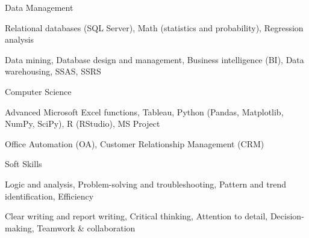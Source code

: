 \documentclass[11pt, a4paper]{awesome-cv}
\begin{document}
\begin{cvskills}

  \cvskill
    {Data Management} %
    {
      \begin{cvitems}
        \item {Relational databases (SQL Server), Math (statistics and probability), Regression analysis}
        \item {Data mining, Database design and management, Business intelligence (BI), Data warehousing, SSAS, SSRS}
      \end{cvitems}
    }

  \cvskill
    {Computer Science} %
    {
      \begin{cvitems} %
        \item {Advanced Microsoft Excel functions, Tableau, Python (Pandas, Matplotlib, NumPy, SciPy), R (RStudio), MS Project}
        \item {Office Automation (OA), Customer Relationship Management (CRM)}
      \end{cvitems}
    }

  \cvskill
    {Soft Skills} %
    {
      \begin{cvitems} %
        \item {Logic and analysis, Problem-solving and troubleshooting, Pattern and trend identification, Efficiency}
        \item {Clear writing and report writing, Critical thinking, Attention to detail, Decision-making,  Teamwork \& collaboration}
      \end{cvitems}
    }

\end{cvskills}

\end{document}
